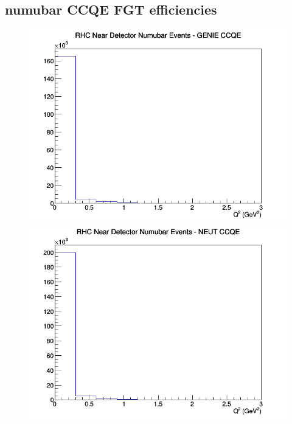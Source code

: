 \subsection{numubar CCQE FGT efficiencies}
\begin{figure}[h]
\includegraphics[width=\linewidth]{eff_Q2/FGT/CCQE_RHC_ND_numubar_Q2_GENIE.png}
\endminipage
{}
\includegraphics[width=\linewidth]{eff_Q2/FGT/CCQE_RHC_ND_numubar_Q2_NEUT.png}
\endminipage
{}

\end{figure}

